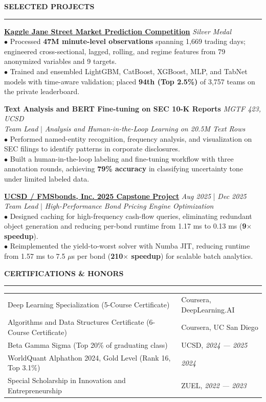 \documentclass{../../../original_CV/resume}
\renewcommand{\sectionskip}{\vspace{0.10cm}}
\renewcommand{\sectionlineskip}{\vspace{0.10cm}}
\renewenvironment{rSection}[1]{
\sectionskip
\textcolor{UC San Diego Blue}{\textbf{\large\bfseries\MakeUppercase{#1}}}
\sectionlineskip
\hrule
\begin{list}{}{
\setlength{\leftmargin}{0em}
}
\item[]
}{
\end{list}
}
\begin{document}
\begin{rSection}{SELECTED PROJECTS}
\noindent
\href{https://github.com/YuankaiTao-super/Kaggle2024-Jane-Street-Real-Time-Market-Data-Forecasting}{\textbf{Kaggle Jane Street Market Prediction Competition}} \hfill \textit{Silver Medal}\\
$\bullet$ Processed \textbf{47M minute-level observations} spanning 1,669 trading days; engineered cross-sectional, lagged, rolling, and regime features from 79 anonymized variables and 9 targets.\\[1.5pt]
$\bullet$ Trained and ensembled LightGBM, CatBoost, XGBoost, MLP, and TabNet models with time-aware validation; placed \textbf{94th (Top 2.5\%)} of 3,757 teams on the private leaderboard.

\noindent
\textbf{Text Analysis and BERT Fine-tuning on SEC 10-K Reports} \hfill \textit{MGTF 423, UCSD}\\
\textit{Team Lead} $|$ \textit{Analysis and Human-in-the-Loop Learning on 20.5M Text Rows}\\[4pt]
$\bullet$ Performed named-entity recognition, frequency analysis, and visualization on SEC filings to identify patterns in corporate disclosures.\\[1.5pt]
$\bullet$ Built a human-in-the-loop labeling and fine-tuning workflow with three annotation rounds, achieving \textbf{79\% accuracy} in classifying uncertainty tone under limited labeled data.

\noindent
\href{https://github.com/YuankaiTao-super/Capstone_FMS_2025}{\textbf{UCSD / FMSbonds, Inc. 2025 Capstone Project}} \hfill {\em Aug 2025} | {\em Dec 2025}\\
\textit{Team Lead} $|$ \textit{High-Performance Bond Pricing Engine Optimization}\\[4pt]
$\bullet$ Designed caching for high-frequency cash-flow queries, eliminating redundant object generation and reducing per-bond runtime from 1.17 ms to 0.13 ms (\textbf{9$\times$ speedup}).\\[1.5pt]
$\bullet$ Reimplemented the yield-to-worst solver with Numba JIT, reducing runtime from 1.57 ms to 7.5 $\mu$s per bond (\textbf{210$\times$ speedup}) for scalable batch analytics.
\end{rSection}

\begin{rSection}{CERTIFICATIONS \& HONORS}
\begin{tabularx}{\textwidth}{@{} >{\raggedright\arraybackslash}X >{\raggedleft\arraybackslash\hyphenpenalty=10000\exhyphenpenalty=10000}p{4.8cm} @{}}
Deep Learning Specialization (5-Course Certificate) & Coursera, DeepLearning.AI \\
Algorithms and Data Structures Certificate (6-Course Certificate) & Coursera, UC San Diego \\
Beta Gamma Sigma (Top 20\% of graduating class) & UCSD, {\em 2024 --- 2025} \\
WorldQuant Alphathon 2024, Gold Level (Rank 16, Top 3.1\%) & {\em 2024} \\
Special Scholarship in Innovation and Entrepreneurship & ZUEL, {\em 2022 --- 2023}
\end{tabularx}
\end{rSection}
\end{document}
